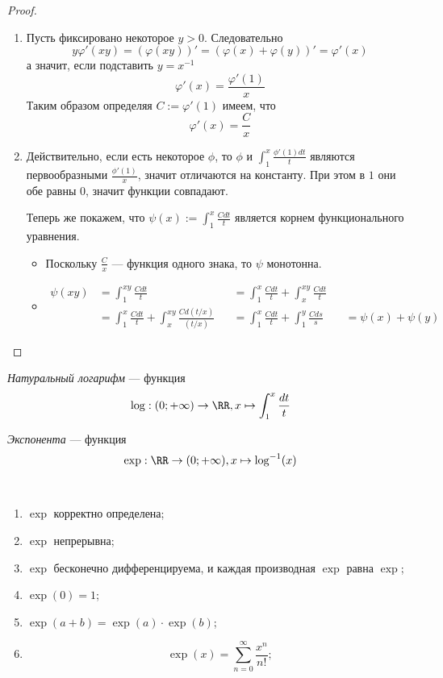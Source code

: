 \documentclass[12pt,a4paper]{article}
\begin{document}
\begin{proof}
\begin{enumerate}
            \item Пусть фиксировано некоторое $y > 0$. Следовательно
                \[y\varphi'(xy) = (\varphi(xy))' = (\varphi(x) + \varphi(y))' = \varphi'(x)\]
                а значит, если подставить $y = x^{-1}$
                \[\varphi'(x) = \frac{\varphi'(1)}{x}\]
                Таким образом определяя $C := \varphi'(1)$ имеем, что
                \[\varphi'(x) = \frac{C}{x}\]
            
            \item Действительно, если есть некоторое $\phi$, то $\phi$ и $\int_1^x \frac{\phi'(1)dt}{t}$ являются первообразными $\frac{\phi'(1)}{x}$, значит отличаются на константу. При этом в $1$ они обе равны $0$, значит функции совпадают.

                Теперь же покажем, что $\psi(x) := \int_1^x \frac{Cdt}{t}$ является корнем функционального уравнения.
                \begin{itemize}
                    \item Поскольку $\frac{C}{x}$ --- функция одного знака, то $\psi$ монотонна.
                    \item
                        \begin{align*}
                            \psi(xy)
                            &= \int_1^{xy} \frac{Cdt}{t}&
                            &= \int_1^x \frac{Cdt}{t} + \int_x^{xy} \frac{Cdt}{t}\\
                            &= \int_1^x \frac{Cdt}{t} + \int_x^{xy} \frac{Cd(t/x)}{(t/x)}&
                            &= \int_1^x \frac{Cdt}{t} + \int_1^{y} \frac{Cds}{s}&
                            &= \psi(x) + \psi(y)
                        \end{align*}
                \end{itemize}
        \end{enumerate}
    \end{proof}

    \begin{definition}
        \emph{Натуральный логарифм} --- функция
        \[\log: (0; +\infty) \to \RR, x \mapsto \int_1^x \frac{dt}{t}\]

        \emph{Экспонента} --- функция
        \[\exp: \RR \to (0; +\infty), x \mapsto \log^{-1}(x)\]
    \end{definition}

    \begin{theorem}\ 
        \begin{enumerate}
            \item $\exp$ корректно определена;
            \item $\exp$ непрерывна;
            \item $\exp$ бесконечно дифференцируема, и каждая производная $\exp$ равна $\exp$;
            \item $\exp(0) = 1$;
            \item $\exp(a + b) = \exp(a) \cdot \exp(b)$;
            \item \[\exp(x) = \sum_{n=0}^\infty \frac{x^n}{n!};\]
        \end{enumerate}
    \end{theorem}
\end{document}
